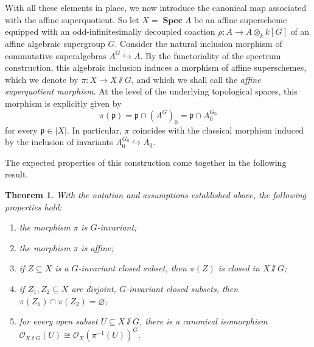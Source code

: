 \documentclass[11pt,a4paper,reqno,noamsfonts]{amsart}
\numberwithin{equation}{section}
\newtheorem{theorem}{Theorem}[section]
\theoremstyle{definition}
\theoremstyle{remark}
\newcommand{\Ocal}{\ensuremath{\mathscr{O}}}
\newcommand{\pfrak}{\ensuremath{\mathfrak{p}}}
\DeclareMathOperator{\sSpec}{\mathbf{Spec}}
\begin{document}
With all these elements in place, we now introduce the canonical map associated with the affine superquotient. So let $X = \sSpec A$ be an affine superscheme equipped with an odd-infinitesimally decoupled coaction $\rho \colon A \to A \otimes_k k[G]$ of an affine algebraic supergroup $G$. Consider the natural inclusion morphism of commutative superalgebras $A^G \hookrightarrow A$. By the functoriality of the spectrum construction, this algebraic inclusion induces a morphism of affine superschemes, which we denote by $\pi \colon X \to X {\sslash} G$, and which we shall call the \emph{affine superquotient morphism}. At the level of the underlying topological spaces, this morphism is explicitly given by
\begin{equation}
\pi(\pfrak) = \pfrak \cap (A^G)_0 = \pfrak \cap A_0^{G_0}
\end{equation}
for every $\pfrak \in \lvert X \rvert$. In particular, $\pi$ coincides with the classical morphism induced by the inclusion of invariants $A_0^{G_0} \hookrightarrow A_0$.

The expected properties of this construction come together in the following result.

\begin{theorem}
With the notation and assumptions established above, the following properties hold:
\begin{enumerate}
\item the morphism $\pi$ is $G$-invariant;

\item the morphism $\pi$ is affine;

\item if $Z \subseteq X$ is a $G$-invariant closed subset, then $\pi(Z)$ is closed in $X {\sslash} G$;

\item if $Z_1, Z_2 \subseteq X$ are disjoint, $G$-invariant closed subsets, then $\pi(Z_1) \cap \pi(Z_2) = \varnothing$;

\item for every open subset $U \subseteq X {\sslash} G$, there is a canonical isomorphism $\Ocal_{X {\sslash} G}(U) \cong \Ocal_X(\pi^{-1}(U))^G$.
\end{enumerate}
\end{theorem}
\end{document}
